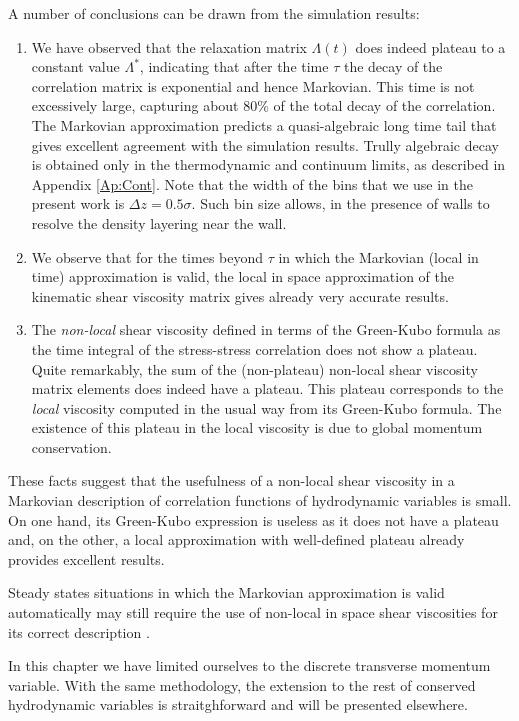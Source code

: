 \documentclass[a4paper,openright,12pt]{book}
\newcommand{\Pendiente}[1]{{\color{green}#1}} %
\begin{document}
A number of conclusions can be drawn from the simulation results:
\begin{enumerate}
\item We  have observed that  the relaxation matrix  $\Lambda(t)$ does
  indeed  plateau to  a  constant value  $\Lambda^*$, indicating  that
  after  the  time $\tau$  the  decay  of  the correlation  matrix  is
  exponential  and  hence Markovian.   \Pendiente{This  time  is not  excessively
    large, capturing about  80\% of the total decay  of the correlation}.
  The  Markovian approximation  predicts a  quasi-algebraic long  time
  tail  that gives  excellent agreement  with the  simulation results.
  Trully algebraic  decay is  obtained only  in the  thermodynamic and
  continuum limits, as described  in Appendix \ref{Ap:Cont}. Note that
  the width  of the bins  that we use in  the present work  is $\Delta
  z=0.5\sigma$.  Such bin  size allows,  in the  presence of  walls to
  resolve the density layering near the wall.
\item  We observe  that  for  the times  beyond  $\tau$  in which  the
  Markovian (local in time) approximation is valid, the local in space
  approximation of the kinematic  shear viscosity matrix gives already
  very accurate results.
\item The \textit{non-local}  shear viscosity defined in  terms of the
  Green-Kubo  formula  as  the  time  integral  of  the  stress-stress
  correlation does  not show a  plateau. Quite remarkably, the  sum of
  the  (non-plateau) non-local  shear viscosity  matrix elements  does
  indeed   have  a   plateau.    This  plateau   corresponds  to   the
  \textit{local}  viscosity  computed  in   the  usual  way  from  its
  Green-Kubo  formula. The  existence  of this  plateau  in the  local
  viscosity is due to global momentum conservation.
\end{enumerate}
These facts suggest that the usefulness of a non-local shear viscosity
in a  Markovian description  of correlation functions  of hydrodynamic
variables is small.  On one hand, its Green-Kubo expression is useless
as it does not have a plateau and, on the other, a local approximation
with well-defined plateau already provides excellent results.

Steady states situations in which the Markovian approximation is valid
automatically may  still require the  use of non-local in  space shear
viscosities for its correct description \cite{.}.

In  this chapter  we  have  limited  ourselves to  the  discrete
transverse  momentum   variable.   With  the  same   methodology,  the
extension  to   the  rest  of  conserved   hydrodynamic  variables  is
straitghforward and will be presented elsewhere. 
\end{document}

